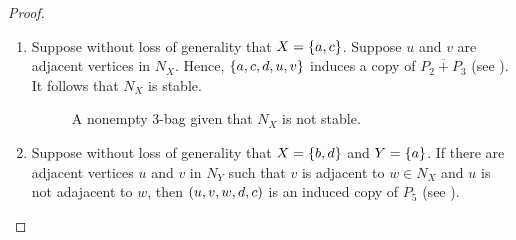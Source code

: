 \begin{proof}
    \leavevmode \par
    \begin{enumerate}[label=(\roman*)]
        \item Suppose without loss of generality that $X=\left\{a,c\right\}$. Suppose $u$
            and $v$ are adjacent vertices in $N_{X}$. Hence, $\left\{a,c,d,u,v\right\}$
            induces a copy of $\overline{P_2 + P_3}$ (see
            ). It follows that $N_X$ is stable.

            \begin{figure}[htb!]
                \centering
                \caption{A nonempty 3-bag given that $N_X$ is not stable.}
                \label{fig:3_bags_empty}
            \end{figure}
    
        \item Suppose without loss of generality that $X=\left\{b,d\right\}$ and $Y=\left\{a\right\}$.
            If there are adjacent vertices $u$ and $v$ in $N_Y$ such that $v$ is
            adjacent to $w\in N_X$ and $u$ is not adajacent to $w$, then
            $\left(u,v,w,d,c\right)$ is an induced copy of $P_5$ (see
            ).

            \begin{figure}[htb!]
                \centering
\end{figure}
\end{enumerate}
\end{proof}
